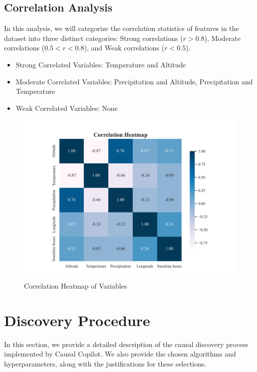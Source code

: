 \documentclass{article}
\begin{document}
\subsection{Correlation Analysis}
\begin{minipage}[t]{0.5\linewidth}
    In this analysis, we will categorize the correlation statistics of features in the dataset into three distinct categories: Strong correlations ($r>0.8$), Moderate correlations ($0.5<r<0.8$), and Weak correlations ($r<0.5$).

\begin{itemize}
\item Strong Correlated Variables: Temperature and Altitude
\item Moderate Correlated Variables: Precipitation and Altitude, Precipitation and Temperature
\item Weak Correlated Variables: None
\end{itemize}
\vfill
\end{minipage}
\hfill
\begin{minipage}[t]{0.5\linewidth}
    \begin{figure}[H]
        \centering
        \vspace{-1.5cm}
        \includegraphics[width=\linewidth]{data/dataset/DWD/output_graph/eda_corr.jpg}
        \caption{\label{fig:corr}Correlation Heatmap of Variables}
    \end{figure}
\end{minipage}

\section{Discovery Procedure}
In this section, we provide a detailed description of the causal discovery process implemented by Causal Copilot. We also provide the chosen algorithms and hyperparameters, along with the justifications for these selections.
\end{document}
